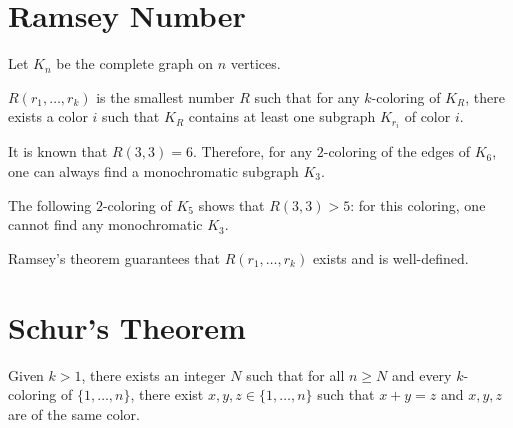 





\maketitle

\section{Ramsey Number}

Let $K_n$ be the complete graph on $n$ vertices.

\begin{definition}
	$R(r_1, \dots, r_k)$ is the smallest number $R$ such that for any $k$-coloring of $K_R$, there exists a color $i$ such that $K_R$ contains at least one subgraph $K_{r_i}$ of color $i$.
\end{definition}

\begin{example}
	It is known that $R(3,3) = 6$. Therefore, for any $2$-coloring of the edges of $K_6$, one can always find a monochromatic subgraph $K_3$.

	The following $2$-coloring of $K_5$ shows that $R(3,3) > 5$: for this coloring, one cannot find any monochromatic $K_3$.

\begin{center}
\end{center}

\end{example}

Ramsey's theorem guarantees that $R(r_1, \dots, r_k)$ exists and is well-defined.


\section{Schur's Theorem}

\begin{theorem}[Schur]
\label{thm:schur}
Given $k > 1$, there exists an integer $N$ such that for all $n \geq N$ and every $k$-coloring of $\{1, \dots, n\}$, there exist $x, y, z \in \{1, \dots, n\}$ such that $x + y = z$ and $x, y, z$ are of the same color.
\end{theorem}

